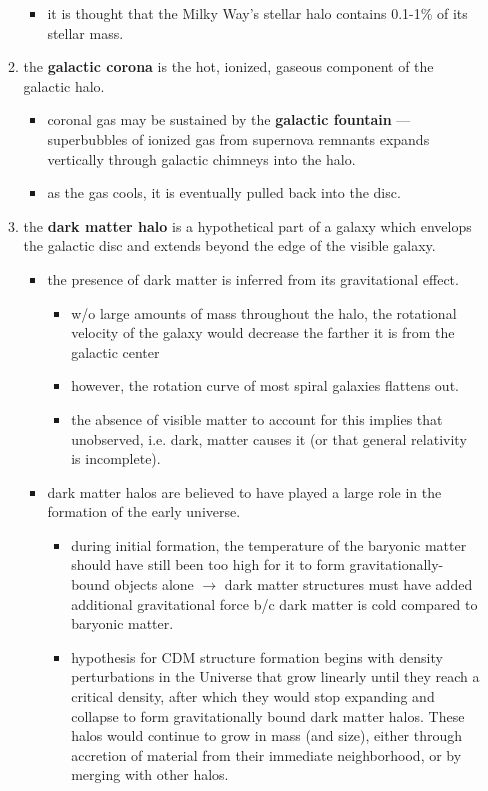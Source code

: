 \begin{enumerate}
\begin{enumerate}
\begin{itemize}[noitemsep]
					\item it is thought that the Milky Way's stellar halo contains 0.1-1\% of its stellar mass.
				\end{itemize}
			\item the \textbf{galactic corona} is the hot, ionized, gaseous component of the galactic halo.
				\begin{itemize}[noitemsep]
					\item coronal gas may be sustained by the \textbf{galactic fountain} --- superbubbles of ionized gas from supernova remnants expands vertically through galactic chimneys into the halo.
					\item as the gas cools, it is eventually pulled back into the disc.
				\end{itemize}
			\item the \textbf{dark matter halo} is a hypothetical part of a galaxy which envelops the galactic disc and extends beyond the edge of the visible galaxy.
				\begin{itemize}[noitemsep]
					\item the presence of dark matter is inferred from its gravitational effect.
						\begin{itemize}[noitemsep]
							\item w/o large amounts of mass throughout the halo, the rotational velocity of the galaxy would decrease the farther it is from the galactic center
							\item however, the rotation curve of most spiral galaxies flattens out.
							\item the absence of visible matter to account for this implies that unobserved, i.e. dark, matter causes it (or that general relativity is incomplete).
						\end{itemize}
					\item dark matter halos are believed to have played a large role in the formation of the early universe.
						\begin{itemize}[noitemsep]
							\item during initial formation, the temperature of the baryonic matter should have still been too high for it to form gravitationally-bound objects alone $\rightarrow$ dark matter structures must have added additional gravitational force b/c dark matter is cold compared to baryonic matter.
							\item hypothesis for CDM structure formation begins with density perturbations in the Universe that grow linearly until they reach a critical density, after which they would stop expanding and collapse to form gravitationally bound dark matter halos. These halos would continue to grow in mass (and size), either through accretion of material from their immediate neighborhood, or by merging with other halos.
						\end{itemize}
				\end{itemize}
		\end{enumerate}
\end{enumerate}